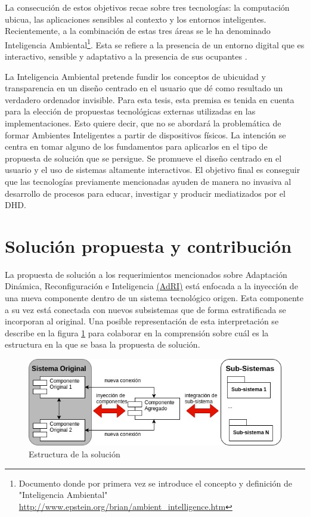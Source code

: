La consecución de estos objetivos recae sobre tres tecnologías: la computación
ubicua, las aplicaciones sensibles al contexto y los entornos inteligentes.
Recientemente, a la combinación de estas tres áreas se le ha denominado
Inteligencia 
Ambiental\footnote{
Documento donde por primera vez se introduce el concepto y definición de
"Inteligencia
Ambiental"  \url{http://www.epstein.org/brian/ambient_intelligence.htm}}. Esta
se refiere a la presencia de un entorno digital
que es interactivo, sensible y adaptativo a la presencia de sus ocupantes
\cite{cap1.16}.

La Inteligencia Ambiental pretende fundir los conceptos de ubicuidad y
transparencia en un diseño centrado en el usuario que dé como resultado un
verdadero ordenador invisible. Para esta tesis, esta premisa es tenida en
cuenta para la elección de propuestas tecnológicas externas utilizadas en las
implementaciones. Esto quiere decir, que no se abordará la problemática de
formar Ambientes Inteligentes a partir de dispositivos físicos. La intención se
centra en tomar alguno de los fundamentos para aplicarlos en el tipo de
propuesta de solución que se persigue. Se promueve el diseño centrado en el
usuario y el uso de sistemas altamente interactivos. El objetivo
final es conseguir que las tecnologías previamente mencionadas ayuden de
manera no invasiva al desarrollo de procesos para educar, investigar y producir
mediatizados por el DHD.

\section{Solución propuesta y contribución}

La propuesta de solución a los requerimientos mencionados sobre
Adaptación Dinámica, Reconfiguración e Inteligencia \hyperref[AdRI]{(AdRI)} 
está enfocada a la
inyección de una nueva componente dentro de un sistema tecnológico origen. Esta
componente a su vez está conectada con nuevos subsistemas que de forma
estratificada se incorporan al original. Una posible representación de
esta interpretación se describe en la figura \ref{fig:solucion} para colaborar
en la comprensión sobre cuál es la estructura en la que se basa la propuesta de
solución.


\begin{figure}[h]
\begin{center}
\includegraphics[width=5 in,totalheight=3 in] {Ch0/EstructuraSolucion}
\caption{Estructura de la solución} \label{fig:solucion}
\end{center}
\end{figure}

